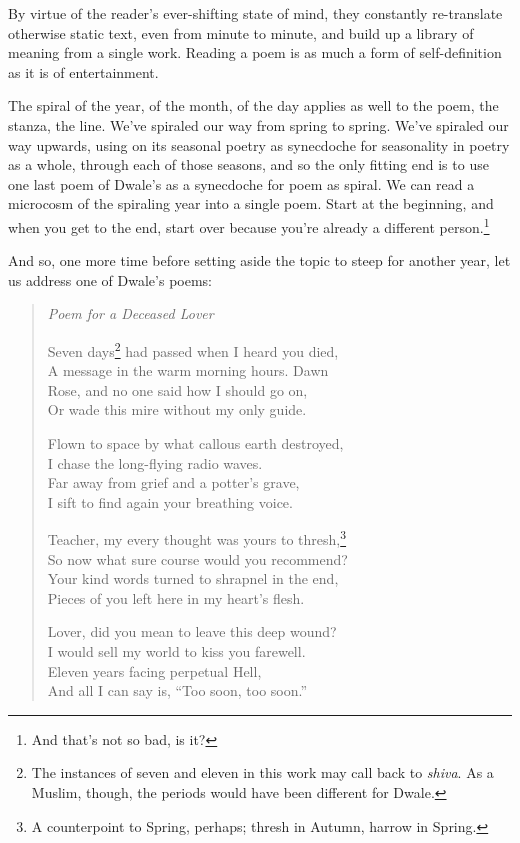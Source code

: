 \documentclass[12pt,oneside]{memoir}
\begin{document}
By virtue of the reader's ever-shifting state of mind, they constantly re-translate otherwise static text, even from minute to minute, and build up a library of meaning from a single work. Reading a poem is as much a form of self-definition as it is of entertainment.

The spiral of the year, of the month, of the day applies as well to the poem, the stanza, the line. We've spiraled our way from spring to spring. We've spiraled our way upwards, using on its seasonal poetry as synecdoche for seasonality in poetry as a whole, through each of those seasons, and so the only fitting end is to use one last poem of Dwale's as a synecdoche for poem as spiral. We can read a microcosm of the spiraling year into a single poem. Start at the beginning, and when you get to the end, start over because you're already a different person.\footnote{And that's not so bad, is it?}

And so, one more time before setting aside the topic to steep for another year, let us address one of Dwale's poems:

\begin{verse}
\emph{Poem for a Deceased Lover}

Seven days\footnote{The instances of seven and eleven in this work may call back to \emph{shiva}. As a Muslim, though, the periods would have been different for Dwale.} had passed when I heard you died, \\
A message in the warm morning hours. Dawn \\
Rose, and no one said how I should go on, \\
Or wade this mire without my only guide.

Flown to space by what callous earth destroyed, \\
I chase the long-flying radio waves. \\
Far away from grief and a potter's grave, \\
I sift to find again your breathing voice.

Teacher, my every thought was yours to thresh,\footnote{A counterpoint to Spring, perhaps; thresh in Autumn, harrow in Spring.} \\
So now what sure course would you recommend? \\
Your kind words turned to shrapnel in the end, \\
Pieces of you left here in my heart's flesh.

Lover, did you mean to leave this deep wound? \\
I would sell my world to kiss you farewell. \\
Eleven years facing perpetual Hell, \\
And all I can say is, ``Too soon, too soon.''

\parencite[14]{leaves}
\end{verse}
\end{document}
